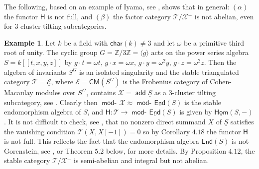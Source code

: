\documentclass[oneside, a4paper,reqno]{amsart}
\numberwithin{equation}{section}
\theoremstyle{definition}
\newtheorem{exam}[thm]{Example}
\begin{document}
The following, based on an example of Iyama, see \cite{KR1}, shows that in general: $(\alpha)$ the functor $\mathsf{H}$ is not full, and $(\beta)$ the factor category ${\mathcal T}/{\mathcal X}^{\bot}$ is not abelian, even for $3$-cluster tilting subcategories.    

 \begin{exam}  Let $k$ be a field with $\mathsf{char}(k) \neq 3$  and let $\omega$ be a primitive third root of unity.  The cyclic group $G = \mathbb Z/3\mathbb Z = \langle g\rangle$ acts on the power series algebra $S = k[[t,x,y,z]]$ by $g \cdot t = \omega t, \, g\cdot x = \omega x, \, g \cdot y = \omega^{2} y, \, g\cdot z = \omega^{2} z$. Then the algebra of invariants $S^{G}$ is an isolated singularity  and the stable triangulated category ${\mathcal T} = \underline{\mathscr E}$, where ${\mathscr E} = \mathsf{CM}(S^{G})$ is the Frobenius category of Cohen-Macaulay modules over $S^{G}$, contains ${\mathcal X} = \operatorname*{\mathsf{add}}\underline{S}$ as a $3$-cluster tilting subcategory, see \cite{KR1}.   Clearly then $\operatorname*{\mathsf{mod}-\!}{\mathcal X} \approx \operatorname*{\mathsf{mod}-\!}\operatorname*{\underline{\mathsf{End}}}(S)$ is the stable endomorphism algebra of $S$, and $\mathsf{H} \colon {\mathcal T} {\longrightarrow}  \operatorname*{\mathsf{mod}-\!}\operatorname*{\underline{\mathsf{End}}}(S)$ is given by $\operatorname*{\underline{\mathsf{Hom}}}(S,-)$. It is not difficult to check, see \cite{B}, that  no nonzero  direct summand $X$ of $\underline{S}$ satisfies the vanishing condition ${\mathcal T}(X,X[-1]) = 0$ so by Corollary $4.18$ the functor $\mathsf{H}$ is not full.  This reflects the fact that the endomorphism algebra   $\operatorname*{\underline{\mathsf{End}}}(S)$ is not Gorenstein, see \cite{KR1, B}, or Theorem $5.2$ below, for more details. By Proposition $4.12$,  the stable category ${\mathcal T}/{\mathcal X}^{\bot}$ is semi-abelian and integral but not abelian. 
\end{exam}
\end{document}
